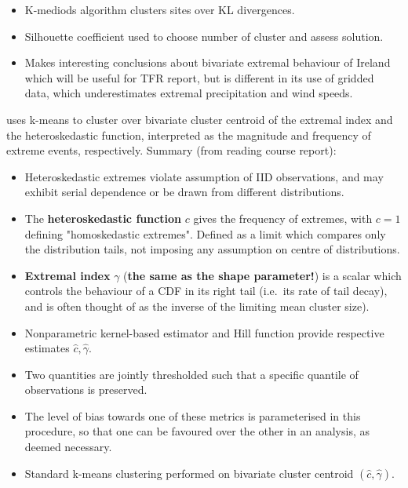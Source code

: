 \documentclass{article}
\numberwithin{equation}{section}
\begin{document}
\begin{itemize}
\begin{itemize}
  \end{itemize}
  \item K-mediods algorithm clusters sites over KL divergences. 
  \item Silhouette coefficient used to choose number of cluster and assess solution. 
  \item Makes interesting conclusions about bivariate extremal behaviour of Ireland which will be useful for TFR report, but is different in its use of gridded data, which underestimates extremal precipitation and wind speeds. 
\end{itemize}

\cite{deCarvalho2023} uses k-means to cluster over bivariate cluster centroid of the extremal index and the heteroskedastic function, interpreted as the magnitude and frequency of extreme events, respectively. 
Summary (from reading course report):
\begin{itemize}
  \item Heteroskedastic extremes violate assumption of IID observations, and may exhibit serial dependence or be drawn from different distributions. 
  \item The \textbf{heteroskedastic function} $c$ gives the frequency of extremes, with $c = 1$ defining "homoskedastic extremes". 
  Defined as a limit which compares only the distribution tails, not imposing any assumption on centre of distributions. 
  \item \textbf{Extremal index} $\gamma$ (\textbf{the same as the shape parameter!}) is a scalar which controls the behaviour of a CDF in its right tail (i.e.\ its rate of tail decay), and is often thought of as the inverse of the limiting mean cluster size).
  \item Nonparametric kernel-based estimator and Hill function provide respective estimates $\hat{c}, \hat{\gamma}$.
  \item Two quantities are jointly thresholded such that a specific quantile of observations is preserved. 
  \item The level of bias towards one of these metrics is parameterised in this procedure, so that one can be favoured over the other in an analysis, as deemed necessary. 
  \item Standard k-means clustering performed on bivariate cluster centroid $(\hat{c}, \hat{\gamma})$.
\end{itemize}


\end{document}
